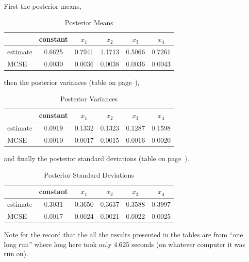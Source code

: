 \documentclass{article}
\begin{document}
First the posterior means,
\begin{table}[ht]
\caption{Posterior Means}
\label{tab:mu}
\begin{center}
\begin{tabular}{lccccc}
  \hline
 & constant & $x_1$ & $x_2$ & $x_3$ & $x_4$ \\ 
  \hline
estimate & 0.6625 & 0.7941 & 1.1713 & 0.5066 & 0.7261 \\ 
  MCSE & 0.0030 & 0.0036 & 0.0038 & 0.0036 & 0.0043 \\ 
   \hline
\end{tabular}\end{center}
\end{table}
then the posterior variances (table on page~\pageref{tab:sigmasq}),
\begin{table}[ht]
\caption{Posterior Variances}
\label{tab:sigmasq}
\begin{center}
\begin{tabular}{lccccc}
  \hline
 & constant & $x_1$ & $x_2$ & $x_3$ & $x_4$ \\ 
  \hline
estimate & 0.0919 & 0.1332 & 0.1323 & 0.1287 & 0.1598 \\ 
  MCSE & 0.0010 & 0.0017 & 0.0015 & 0.0016 & 0.0020 \\ 
   \hline
\end{tabular}\end{center}
\end{table}
and finally the posterior standard deviations
(table on page~\pageref{tab:sigma}).
\begin{table}[ht]
\caption{Posterior Standard Deviations}
\label{tab:sigma}
\begin{center}
\begin{tabular}{lccccc}
  \hline
 & constant & $x_1$ & $x_2$ & $x_3$ & $x_4$ \\ 
  \hline
estimate & 0.3031 & 0.3650 & 0.3637 & 0.3588 & 0.3997 \\ 
  MCSE & 0.0017 & 0.0024 & 0.0021 & 0.0022 & 0.0025 \\ 
   \hline
\end{tabular}\end{center}
\end{table}

Note for the record that the all the results presented in the tables
are from ``one long run'' where long here took only
4.625 seconds (on whatever computer it was run on).
\end{document}
